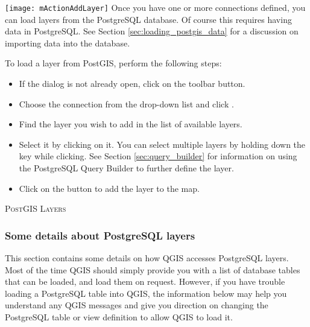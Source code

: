 \texttt{[image: mActionAddLayer]} Once you have one or more
connections defined, you can load layers from the PostgreSQL database. Of
course this requires having data in PostgreSQL. See Section
\ref{sec:loading_postgis_data} for a discussion on importing data into the
database. 

To load a layer from PostGIS, perform the following steps:

\begin{itemize}
\item If the  dialog is not already open, click on the
 toolbar button.
\item Choose the connection from the drop-down list and click .
\item Find the layer you wish to add in the list of available layers.
\item Select it by clicking on it. You can select multiple layers by holding
down the  key while clicking. See Section \ref{sec:query_builder} for
information on using the PostgreSQL Query Builder to further define the layer.
\item Click on the  button to add the layer to the map.
\end{itemize}

\begin{Tip}\caption{\textsc{PostGIS Layers}}
\end{Tip}

\subsubsection{Some details about PostgreSQL
layers}\label{sec:postgis_details}

This section contains some details on how QGIS accesses PostgreSQL
layers. Most of the time QGIS should simply provide you with a list of
database tables that can be loaded, and load them on request. However,
if you have trouble loading a PostgreSQL table into QGIS, the information
below may help you understand any QGIS messages and give you direction on
changing the PostgreSQL table or view definition to allow QGIS to load it.

